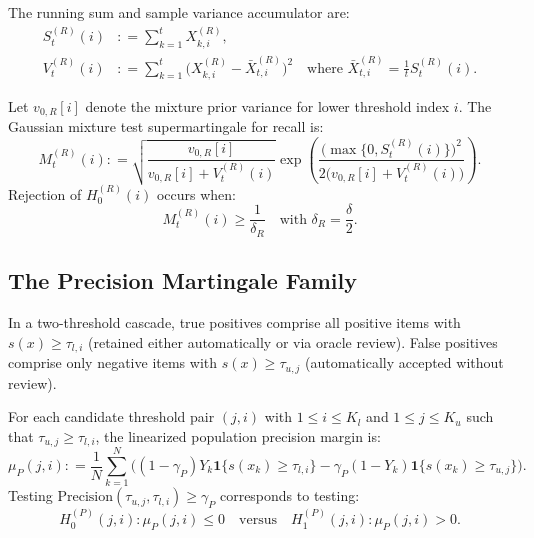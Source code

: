 \documentclass[11pt,a4paper]{article}
\newcommand{\coloneqq}{\mathrel{\mathop:}=}
\begin{document}
The running sum and sample variance accumulator are:
\begin{align}
S_t^{(R)}(i) &\coloneqq \sum_{k=1}^t X_{k, i}^{(R)}, \label{eq:st_recall} \\
V_t^{(R)}(i) &\coloneqq \sum_{k=1}^t \big(X_{k, i}^{(R)} - \bar{X}_{t, i}^{(R)}\big)^2 \quad \text{where } \bar{X}_{t, i}^{(R)} = \frac{1}{t} S_t^{(R)}(i). \label{eq:vt_recall}
\end{align}

Let $v_{0, R}[i]$ denote the mixture prior variance for lower threshold index $i$. The Gaussian mixture test supermartingale for recall is:
\begin{equation}\label{eq:gm_recall}
M_t^{(R)}(i) \coloneqq \sqrt{\frac{v_{0, R}[i]}{v_{0, R}[i] + V_t^{(R)}(i)}} \exp\left( \frac{\big(\max\{0, S_t^{(R)}(i)\}\big)^2}{2\big(v_{0, R}[i] + V_t^{(R)}(i)\big)} \right).
\end{equation}
Rejection of $H_0^{(R)}(i)$ occurs when:
\begin{equation}\label{eq:reject_recall}
M_t^{(R)}(i) \ge \frac{1}{\delta_R} \quad \text{with } \delta_R = \frac{\delta}{2}.
\end{equation}

\subsection{The Precision Martingale Family}
In a two-threshold cascade, true positives comprise all positive items with $s(x) \ge \tau_{l, i}$ (retained either automatically or via oracle review). False positives comprise only negative items with $s(x) \ge \tau_{u, j}$ (automatically accepted without review).

For each candidate threshold pair $(j, i)$ with $1 \le i \le K_l$ and $1 \le j \le K_u$ such that $\tau_{u, j} \ge \tau_{l, i}$, the linearized population precision margin is:
\begin{equation}\label{eq:precision_margin}
\mu_P(j, i) \coloneqq \frac{1}{N}\sum_{k=1}^N \Big( (1 - \gamma_P) Y_k \mathbf{1}\{s(x_k) \ge \tau_{l, i}\} - \gamma_P (1 - Y_k) \mathbf{1}\{s(x_k) \ge \tau_{u, j}\} \Big).
\end{equation}
Testing $\text{Precision}(\tau_{u, j}, \tau_{l, i}) \ge \gamma_P$ corresponds to testing:
\begin{equation}\label{eq:h0_precision}
H_0^{(P)}(j, i) : \mu_P(j, i) \le 0 \quad \text{versus} \quad H_1^{(P)}(j, i) : \mu_P(j, i) > 0.
\end{equation}
\end{document}
